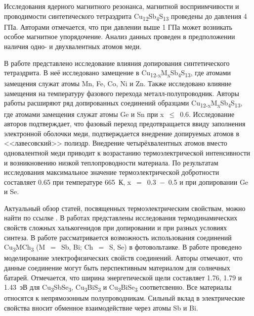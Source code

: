 Исследования ядерного магнитного резонанса, магнитной восприимчивости и проводимости синтетического тетраэдрита Cu\textsubscript{12}Sb\textsubscript{4}S\textsubscript{13} проведены\cite{Kitagawa2015} до давления 4 ГПа. Авторами отмечается, что при давлении выше 1 ГПа может возникать особое магнитное упорядочение. Анализ данных проведен в предположении наличия одно- и двухвалентных атомов меди.


В работе \cite{Kosaka2017} представлено исследование влияния допирования синтетического тетраэдрита. В неё исследовано замещение в Cu\textsubscript{12-x}M\textsubscript{x}Sb\textsubscript{4}S\textsubscript{13}, где атомами замещения служат атомы Mn, Fe, Co, Ni и Zn. Также исследовано влияние замещения на температуру фазового перехода металл-полупроводник. Авторы работы расширяют ряд допированных соединений образцами Cu\textsubscript{12-x}M\textsubscript{x}Sb\textsubscript{4}S\textsubscript{13}, где атомами замещения служат атомы Ge и Sn при x~$\leq $~0.6. Исследование авторов подтверждает, что фазовый переход предотвращается ввиду заполнения электронной оболочки меди, подтверждается внедрение допируемых атомов в <<лавесовский>> полиэдр. Внедрение четырёхвалентных атомов вместо одновалентной меди приводит к возрастанию термоэлектрической интенсивности и возникновению низкой теплопроводности материала. По результатам исследования максимальное значение термоэлектрической добротности составляет 0.65 при температуре 665~К, x~$=$~0.3~$-$~0.5 и при допировании Ge и Se.

Актуальный обзор статей, посвященных термоэлектрическим свойствам,  можно найти по ссылке \cite{Powella}. В работах \cite{ther_10.1007/s11664-016-4893-7,ther_10.1016/j.intermet.2016.08.003,ther_10.1016/j.jallcom.2017.01.187,ther_10.1039/C7RA02564E,ther_10.1039/C7TC00762K,ther_AENM:AENM201200650,ther_C5TC01636C,ther_C6DT00564K,ther_doi:10.1021/acs.chemmater.7b00891,ther_doi:10.1021/acs.inorgchem.7b02128,ther_doi:10.1021/acs.jpcc.7b02068,ther_doi.org/10.1016/j.jssc.2017.01.003,ther_GONCALVES2016209,ther_HARISH2016323,ther_JACE:JACE13838,ther_lu2014effect}  представлены исследования термодинамических свойств сложных халькогенидов при допировании и при разных условиях синтеза.
В работе \cite{Kehoe_2013} рассматривается возможность использования соединений Cu\textsubscript{3}MCh\textsubscript{3} (M~$=$~Sb, Bi; Ch~$=$~S, Se) в фотовольтаике. В работе проведено моделирование электрофизических свойств соединений.
Авторы отмечают, что данные соединение могут быть перспективным материалом для солнечных батарей. Отмечается, что ширина энергетической щели составляет 1.76, 1.79 и 1.43~эВ для Cu\textsubscript{3}SbSe\textsubscript{3}, Cu\textsubscript{3}BiS\textsubscript{3} и Cu\textsubscript{3}BiSe\textsubscript{3} соответсвенно. Все материалы относятся к непрямозонным полупроводникам. Сильный вклад в электрические свойства вносит обменное взаимодействие через атомы Sb и Bi.
\newpage
